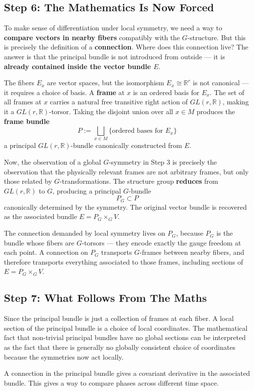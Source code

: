 \documentclass[a4paper]{article}
\begin{document}
\subsection*{Step 6: The Mathematics Is Now Forced}

To make sense of differentiation under local symmetry, we need a way to 
\textbf{compare vectors in nearby fibers} compatibly with the $G$-structure. But this is 
precisely the definition of a \textbf{connection}.
Where does this connection live? The answer is that the principal bundle is not introduced 
from outside — it is \textbf{already contained inside the vector bundle $E$}.

The fibers $E_x$ are vector spaces, but the isomorphism $E_x \cong \mathbb{R}^r$ is not 
canonical — it requires a choice of basis. A \textbf{frame} at $x$ is an ordered basis for 
$E_x$. The set of all frames at $x$ carries a natural free transitive right action of 
$GL(r, \mathbb{R})$, making it a $GL(r,\mathbb{R})$-torsor. Taking the disjoint union over 
all $x \in M$ produces the \textbf{frame bundle}
\[
P := \bigsqcup_{x \in M} \{\text{ordered bases for } E_x\}
\]
a principal $GL(r, \mathbb{R})$-bundle canonically constructed from $E$.

Now, the observation of a global $G$-symmetry in Step 3 is precisely the observation that 
the physically relevant frames are not arbitrary frames, but only those related by 
$G$-transformations. The structure group \textbf{reduces} from $GL(r, \mathbb{R})$ to $G$, 
producing a principal $G$-bundle
\[
P_G \subset P
\]
canonically determined by the symmetry. The original vector bundle is recovered as the 
associated bundle $E = P_G \times_G V$.

The connection demanded by local symmetry lives on $P_G$, because $P_G$ is the bundle whose 
fibers are $G$-torsors — they encode exactly the gauge freedom at each point. A connection 
on $P_G$ transports $G$-frames between nearby fibers, and therefore transports everything 
associated to those frames, including sections of $E = P_G \times_G V$.

\subsection*{Step 7: What Follows From The Maths}

Since the principal bundle is just a collection of frames at each fiber. A local section of the principal bundle is a choice of local coordinates. The mathematical fact that non-trivial principal bundles have no global sections can be interpreted as the fact that there is generally no globally consistent choice of coordinates because the symmetries now act locally. 

A connection in the principal bundle gives a covariant derivative in the associated bundle. This gives a way to compare phases across different time space. 
\end{document}
